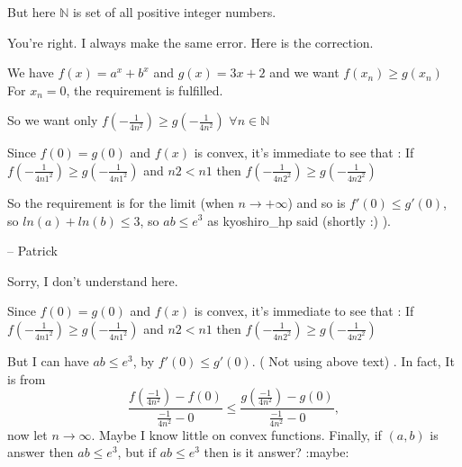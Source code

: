 \begin{mysolution}
	\begin{tcolorbox}But here $\mathbb{N}$ is set of all positive integer numbers.\end{tcolorbox}

You're right. I always make the same error. Here is the correction.

We have $f(x)=a^{x}+b^{x}$ and $g(x)=3x+2$ and we want $f(x_{n})\geq g(x_{n})$
For $x_{n}=0$, the requirement is fulfilled.

So we want only $f(-\frac{1}{4n^{2}})\geq g(-\frac{1}{4n^{2}})$ $\forall n\in \mathbb{N}$

Since $f(0)=g(0)$ and $f(x)$ is convex, it's immediate to see that :
If $f(-\frac{1}{4n1^{2}})\geq g(-\frac{1}{4n1^{2}})$ and $n2 < n1$ then $f(-\frac{1}{4n2^{2}})\geq g(-\frac{1}{4n2^{2}})$

So the requirement is for the limit (when $n \rightarrow+\infty$) and so is $f'(0)\leq g'(0)$, so $ln(a)+ln(b) \leq 3$, so $ab \leq e^{3}$ as kyoshiro\_hp said (shortly  :)  ).

-- 
Patrick
\end{mysolution}



\begin{mysolution}
	Sorry, I don't understand here.
\begin{tcolorbox}

Since $f(0)=g(0)$ and $f(x)$ is convex, it's immediate to see that :
If $f(-\frac{1}{4n1^{2}})\geq g(-\frac{1}{4n1^{2}})$ and $n2 < n1$ then $f(-\frac{1}{4n2^{2}})\geq g(-\frac{1}{4n2^{2}})$
\end{tcolorbox}
But I can have $ab\leq e^{3}$, by $f'(0)\leq g'(0)$. ( Not using above text) . In fact, It is from
\[\frac{f(\frac{-1}{4n^{2}})-f(0)}{\frac{-1}{4n^{2}}-0}\leq \frac{g(\frac{-1}{4n^{2}})-g(0)}{\frac{-1}{4n^{2}}-0}, \]
now let $n\to\infty$. Maybe I know little on convex functions.
Finally, if $(a,b)$ is answer then $ab\leq e^{3}$, but if $ab\leq e^{3}$ then is it answer?  :maybe:
\end{mysolution}



